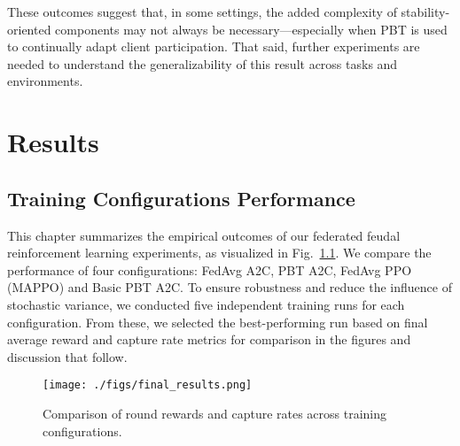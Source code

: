\documentclass[12pt,a4paper,twoside,openany]{book}
\begin{document}
These outcomes suggest that, in some settings, the added complexity of stability-oriented components may not always be necessary—especially when PBT is used to continually adapt client participation. That said, further experiments are needed to understand the generalizability of this result across tasks and environments.

\chapter{Results}

\section{Training Configurations Performance}

This chapter summarizes the empirical outcomes of our federated feudal reinforcement learning experiments, as visualized in Fig.~\ref{fig:final_results}. We compare the performance of four configurations: FedAvg A2C, PBT A2C,  FedAvg PPO (MAPPO) and Basic PBT A2C.
To ensure robustness and reduce the influence of stochastic variance, we conducted five independent training runs for each configuration. From these, we selected the best-performing run based on final average reward and capture rate metrics for comparison in the figures and discussion that follow.

\begin{figure}[H]
\centering
\texttt{[image: ./figs/final\_results.png]}
\captionsetup{font=small}
\caption{Comparison of round rewards and capture rates across training configurations.}
\label{fig:final_results}
\end{figure}
\end{document}
